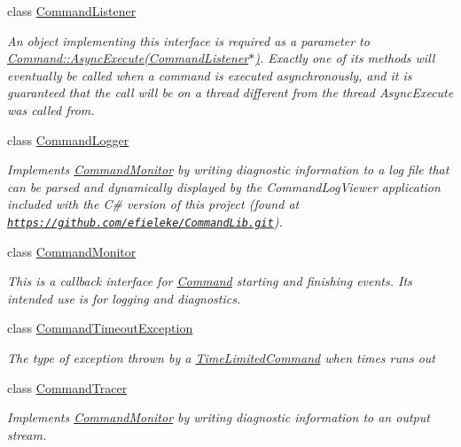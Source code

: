 \begin{DoxyCompactItemize}
class \mbox{\hyperlink{class_command_lib_1_1_command_listener}{Command\+Listener}}
\begin{DoxyCompactList}\small\item\em An object implementing this interface is required as a parameter to \mbox{\hyperlink{class_command_lib_1_1_command_a44bad231a0f0a6de3d5405382d95f800}{Command\+::\+Async\+Execute(\+Command\+Listener$\ast$)}}. Exactly one of its methods will eventually be called when a command is executed asynchronously, and it is guaranteed that the call will be on a thread different from the thread Async\+Execute was called from. \end{DoxyCompactList}\item 
class \mbox{\hyperlink{class_command_lib_1_1_command_logger}{Command\+Logger}}
\begin{DoxyCompactList}\small\item\em Implements \mbox{\hyperlink{class_command_lib_1_1_command_monitor}{Command\+Monitor}} by writing diagnostic information to a log file that can be parsed and dynamically displayed by the Command\+Log\+Viewer application included with the C\# version of this project (found at \href{https://github.com/efieleke/CommandLib.git}{\tt https\+://github.\+com/efieleke/\+Command\+Lib.\+git}). \end{DoxyCompactList}\item 
class \mbox{\hyperlink{class_command_lib_1_1_command_monitor}{Command\+Monitor}}
\begin{DoxyCompactList}\small\item\em This is a callback interface for \mbox{\hyperlink{class_command_lib_1_1_command}{Command}} starting and finishing events. Its intended use is for logging and diagnostics. \end{DoxyCompactList}\item 
class \mbox{\hyperlink{class_command_lib_1_1_command_timeout_exception}{Command\+Timeout\+Exception}}
\begin{DoxyCompactList}\small\item\em The type of exception thrown by a \mbox{\hyperlink{class_command_lib_1_1_time_limited_command}{Time\+Limited\+Command}} when times runs out\end{DoxyCompactList}\item 
class \mbox{\hyperlink{class_command_lib_1_1_command_tracer}{Command\+Tracer}}
\begin{DoxyCompactList}\small\item\em Implements \mbox{\hyperlink{class_command_lib_1_1_command_monitor}{Command\+Monitor}} by writing diagnostic information to an output stream. \end{DoxyCompactList}\item 

\end{DoxyCompactItemize}
